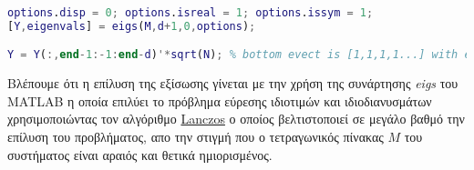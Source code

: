 \begin{lstlisting}[language=Matlab]
options.disp = 0; options.isreal = 1; options.issym = 1; 
[Y,eigenvals] = eigs(M,d+1,0,options);

Y = Y(:,end-1:-1:end-d)'*sqrt(N); % bottom evect is [1,1,1,1...] with eval 0
\end{lstlisting}
Βλέπουμε ότι η επίλυση της εξίσωσης γίνεται με την χρήση της συνάρτησης \textlatin{\textit{eigs}} του \textlatin{MATLAB} η οποία επιλύει το πρόβλημα εύρεσης ιδιοτιμών και ιδιοδιανυσμάτων χρησιμοποιώντας τον αλγόριθμο \href{https://en.wikipedia.org/wiki/Lanczos_algorithm}{\textlatin{Lanczos}}\textlatin{\cite{lanczos}} ο οποίος βελτιστοποιεί σε μεγάλο βαθμό την επίλυση του προβλήματος, απο την στιγμή που ο τετραγωνικός πίνακας $M$ του συστήματος είναι αραιός και θετικά ημιορισμένος.